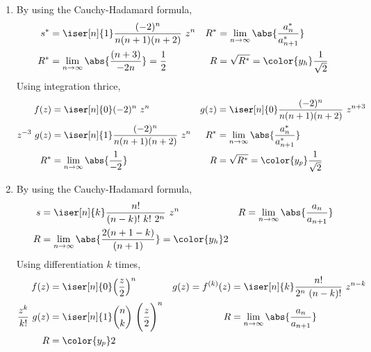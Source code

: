 \begin{enumerate}
    \item By using the Cauchy-Hadamard formula,
          \begin{align}
              s^*                  & = \iser[n]{1} \frac{(-2)^n}{n(n+1)(n+2)}
              \ z^{n}              &
              R^*                  & = \lim_{n \to \infty} \abs{\frac{a^*_n}
              {a^*_{n+1}}}                                                         \\
              R^*                  & = \lim_{n \to \infty} \abs{\frac{(n+3)}
              {-2n}} = \frac{1}{2} &
              R                    & = \sqrt{R^*} = \color{y_h} \frac{1}{\sqrt{2}}
          \end{align}
          Using integration thrice,
          \begin{align}
              f(z)         & = \iser[n]{0} (-2)^n\ z^n                         &
              g(z)         & = \iser[n]{0} \frac{(-2)^n}{n(n+1)(n+2)}\ z^{n+3}   \\
              z^{-3}\ g(z) & = \iser[n]{1} \frac{(-2)^n}{n(n+1)(n+2)}\ z^n     &
              R^*          & = \lim_{n \to \infty} \abs{\frac{a^*_n}
              {a^*_{n+1}}}                                                       \\
              R^*          & = \lim_{n \to \infty} \abs{\frac{1}{-2}}          &
              R            & = \sqrt{R^*}= \color{y_p} \frac{1}{\sqrt{2}}
          \end{align}

    \item By using the Cauchy-Hadamard formula,
          \begin{align}
              s       & = \iser[n]{k} \frac{n!}{(n-k)!\ k!\ 2^n}
              \ z^{n} &
              R       & = \lim_{n \to \infty} \abs{\frac{a_n}
              {a_{n+1}}}                                           \\
              R       & = \lim_{n \to \infty} \abs{\frac{2(n+1-k)}
                  {(n+1)}} = \color{y_h} 2
          \end{align}
          Using differentiation $ k $ times,
          \begin{align}
              f(z)                 & = \iser[n]{0} \Big(\frac{z}{2}\Big)^n           &
              g(z) = f^{(k)}(z)    & = \iser[n]{k} \frac{n!}{2^n\ (n-k)!}\ z^{n-k}     \\
              \frac{z^k}{k!}\ g(z) & = \iser[n]{1} \binom{n}{k}\ \Bigg(\frac{z}{2}
              \Bigg)^n             &
              R                    & = \lim_{n \to \infty} \abs{\frac{a_n}{a_{n+1}}}   \\
              R                    & = \color{y_p} 2
          \end{align}


\end{enumerate}
